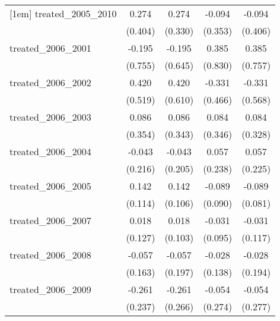 {\begin{tabular}{l*{4}{c}}
[1em]
treated\_2005\_2010&       0.274         &       0.274         &      -0.094         &      -0.094         \\
            &     (0.404)         &     (0.330)         &     (0.353)         &     (0.406)         \\
[1em]
treated\_2006\_2001&      -0.195         &      -0.195         &       0.385         &       0.385         \\
            &     (0.755)         &     (0.645)         &     (0.830)         &     (0.757)         \\
[1em]
treated\_2006\_2002&       0.420         &       0.420         &      -0.331         &      -0.331         \\
            &     (0.519)         &     (0.610)         &     (0.466)         &     (0.568)         \\
[1em]
treated\_2006\_2003&       0.086         &       0.086         &       0.084         &       0.084         \\
            &     (0.354)         &     (0.343)         &     (0.346)         &     (0.328)         \\
[1em]
treated\_2006\_2004&      -0.043         &      -0.043         &       0.057         &       0.057         \\
            &     (0.216)         &     (0.205)         &     (0.238)         &     (0.225)         \\
[1em]
treated\_2006\_2005&       0.142         &       0.142         &      -0.089         &      -0.089         \\
            &     (0.114)         &     (0.106)         &     (0.090)         &     (0.081)         \\
[1em]
treated\_2006\_2007&       0.018         &       0.018         &      -0.031         &      -0.031         \\
            &     (0.127)         &     (0.103)         &     (0.095)         &     (0.117)         \\
[1em]
treated\_2006\_2008&      -0.057         &      -0.057         &      -0.028         &      -0.028         \\
            &     (0.163)         &     (0.197)         &     (0.138)         &     (0.194)         \\
[1em]
treated\_2006\_2009&      -0.261         &      -0.261         &      -0.054         &      -0.054         \\
            &     (0.237)         &     (0.266)         &     (0.274)         &     (0.277)         \\

\end{tabular}}
